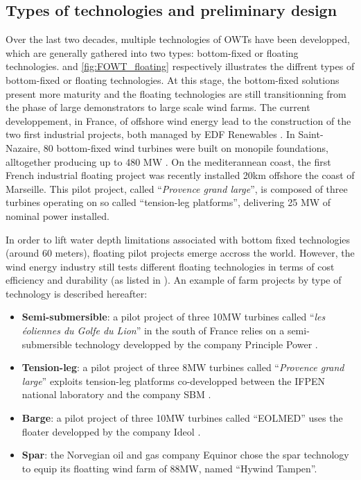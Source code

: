 \subsection{Types of technologies and preliminary design}
Over the last two decades, multiple technologies of OWTs have been developped, which are generally gathered into two types: bottom-fixed or floating technologies. 
 and \ref{fig:FOWT_floating} respectively illustrates the diffrent types of bottom-fixed or floating technologies. 
At this stage, the bottom-fixed solutions present more maturity and the floating technologies are still transitionning from the phase of large demonstrators to large scale wind farms. 
The current developpement, in France, of offshore wind energy lead to the construction of the two first industrial projects, both managed by EDF Renewables . 
In Saint-Nazaire, 80 bottom-fixed wind turbines were built on monopile foundations, alltogether producing up to 480 MW . 
On the mediterannean coast, the first French industrial floating project was recently installed 20km offshore the coast of Marseille. 
This pilot project, called ``\textit{Provence grand large}'', is composed of three turbines operating on so called ``tension-leg platforms'', delivering 25 MW of nominal power installed.     

In order to lift water depth limitations associated with bottom fixed technologies (around 60 meters), floating pilot projects emerge accross the world. 
However, the wind energy industry still tests different floating technologies in terms of cost efficiency and durability (as listed in \citet{mackinnon_2022_FOWT_table}). 
An example of farm projects by type of technology is described hereafter: 
\begin{itemize}
    \item \textbf{Semi-submersible}: a pilot project of three 10MW turbines called ``\textit{les éoliennes du Golfe du Lion}'' in the south of France relies on a semi-submersible technology developped by the company Principle Power \citep{cermelli_2018_windfloat}.   
    \item \textbf{Tension-leg}: a pilot project of three 8MW turbines called ``\textit{Provence grand large}'' exploits tension-leg platforms co-developped between the IFPEN national laboratory and the company SBM \citep{caille_2017_TPL_IFPEN}. 
    \item \textbf{Barge}: a pilot project of three 10MW turbines called ``EOLMED'' uses the floater developped by the company Ideol \citep{guignier_2016_ideol}. 
    \item \textbf{Spar}: the Norvegian oil and gas company Equinor chose the spar technology \citep{driscoll_2016_hywind} to equip its floatting wind farm of 88MW, named ``Hywind Tampen''. 
\end{itemize}

